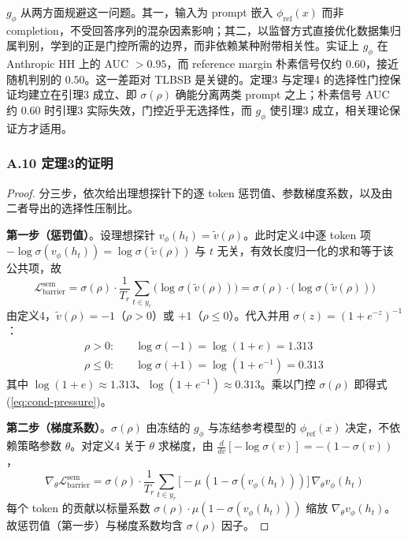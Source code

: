 \documentclass[lettersize,journal]{IEEEtran}
\begin{document}
$g_\phi$ 从两方面规避这一问题。其一，输入为 prompt 嵌入 $\phi_{\text{ref}}(x)$ 而非 completion，不受回答序列的混杂因素影响；其二，以监督方式直接优化数据集归属判别，学到的正是门控所需的边界，而非依赖某种附带相关性。实证上 $g_\phi$ 在 Anthropic HH 上的 AUC $> 0.95$，而 reference margin 朴素信号仅约 $0.60$，接近随机判别的 $0.50$。这一差距对 TLBSB 是关键的。定理3 与定理4 的选择性门控保证均建立在引理3 成立、即 $\sigma(\rho)$ 确能分离两类 prompt 之上；朴素信号 AUC 约 $0.60$ 时引理3 实际失效，门控近乎无选择性，而 $g_\phi$ 使引理3 成立，相关理论保证方才适用。

\subsubsection*{A.10 定理3的证明}\label{app:condpressure}
\begin{proof}
分三步，依次给出理想探针下的逐 token 惩罚值、参数梯度系数，以及由二者导出的选择性压制比。

\textbf{第一步（惩罚值）}。设理想探针 $v_\phi(h_t) = \tilde{v}(\rho)$。此时定义4中逐 token 项 $-\log\sigma(v_\phi(h_t)) = \log\sigma(\tilde{v}(\rho))$ 与 $t$ 无关，有效长度归一化的求和等于该公共项，故
\begin{equation}
\mathcal{L}^{\text{sem}}_{\text{barrier}}
= \sigma(\rho)\cdot\frac{1}{T_r}\sum_{t \in y_r}\bigl(\log\sigma(\tilde{v}(\rho))\bigr)
= \sigma(\rho)\cdot\bigl(\log\sigma(\tilde{v}(\rho))\bigr)
\end{equation}
由定义4，$\tilde{v}(\rho) = -1$（$\rho > 0$）或 $+1$（$\rho \leq 0$）。代入并用 $\sigma(z) = (1+e^{-z})^{-1}$：
\begin{align}
\rho > 0:\quad &\log\sigma(-1) = \log(1 + e) = 1.313\, \\
\rho \leq 0:\quad &\log\sigma(+1) = \log(1 + e^{-1}) = 0.313\,
\end{align}
其中 $\log(1+e) \approx 1.313$、$\log(1+e^{-1}) \approx 0.313$。乘以门控 $\sigma(\rho)$ 即得式(\ref{eq:cond-pressure})。

\textbf{第二步（梯度系数）}。$\sigma(\rho)$ 由冻结的 $g_\phi$ 与冻结参考模型的 $\phi_{\text{ref}}(x)$ 决定，不依赖策略参数 $\theta$。对定义4 关于 $\theta$ 求梯度，由 $\frac{d}{dv}[-\log\sigma(v)] = -(1-\sigma(v))$，
\begin{equation}
\nabla_\theta\mathcal{L}^{\text{sem}}_{\text{barrier}}
= \sigma(\rho)\cdot\frac{1}{T_r}\sum_{t \in y_r}
\bigl[-\mu\,(1-\sigma(v_\phi(h_t)))\bigr]\,\nabla_\theta v_\phi(h_t)
\end{equation}
每个 token 的贡献以标量系数 $\sigma(\rho)\cdot\mu(1-\sigma(v_\phi(h_t)))$ 缩放 $\nabla_\theta v_\phi(h_t)$。故惩罚值（第一步）与梯度系数均含 $\sigma(\rho)$ 因子。


\end{proof}
\end{document}
